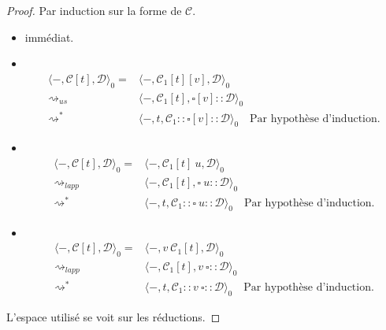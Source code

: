 \documentclass[11pt,a4paper]{article}
\theoremstyle{definition}
\begin{document}
\begin{proof}
  Par induction sur la forme de $\mathcal{C}$.
  \begin{itemize}
    \item {} immédiat.\\
    \item {}\\
  \begin{align*}
    \langle -, \mathcal{C}[t], \mathcal{D}\rangle_0 = &\langle -, \mathcal{C}_1[t][v], \mathcal{D}\rangle_0 \\
    \rightsquigarrow_{us} &\langle -, \mathcal{C}_1[t], \square[v]:: \mathcal{D}\rangle_0 \\
    \rightsquigarrow^* &\langle -, t, \mathcal{C}_1:: \square[v]:: \mathcal{D}\rangle_0 \quad \text{Par hypothèse d'induction.}
  \end{align*}
    \item {}\\
  \begin{align*}
    \langle -, \mathcal{C}[t], \mathcal{D}\rangle_0 = &\langle -, \mathcal{C}_1[t]~u, \mathcal{D}\rangle_0 \\
    \rightsquigarrow_{lapp} &\langle -, \mathcal{C}_1[t], \square~u:: \mathcal{D}\rangle_0 \\
    \rightsquigarrow^* &\langle -, t, \mathcal{C}_1:: \square~u:: \mathcal{D}\rangle_0 \quad \text{Par hypothèse d'induction.}
  \end{align*}
    \item {}\\
  \begin{align*}
    \langle -, \mathcal{C}[t], \mathcal{D}\rangle_0 = &\langle -, v~\mathcal{C}_1[t], \mathcal{D}\rangle_0 \\
    \rightsquigarrow_{lapp} &\langle -, \mathcal{C}_1[t], v~\square:: \mathcal{D}\rangle_0 \\
    \rightsquigarrow^* &\langle -, t, \mathcal{C}_1:: v~\square:: \mathcal{D}\rangle_0 \quad \text{Par hypothèse d'induction.}
  \end{align*}
  \end{itemize}
  L'espace utilisé se voit sur les réductions.
\end{proof}
\end{document}
